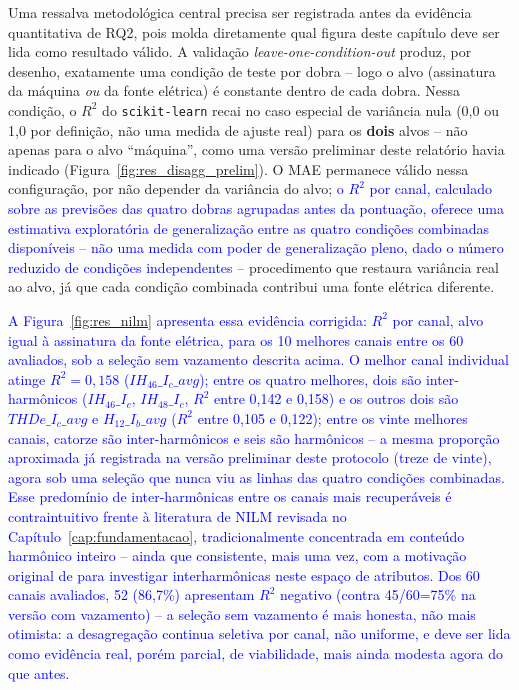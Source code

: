 \documentclass[times,final]{elsarticle}
\begin{document}
Uma ressalva metodológica central precisa ser registrada antes da evidência quantitativa de RQ2, pois molda diretamente qual figura deste capítulo deve ser lida como resultado válido. A validação \textit{leave-one-condition-out} produz, por desenho, exatamente uma condição de teste por dobra -- logo o alvo (assinatura da máquina \emph{ou} da fonte elétrica) é constante dentro de cada dobra. Nessa condição, o $R^2$ do \texttt{scikit-learn} recai no caso especial de variância nula (0,0 ou 1,0 por definição, não uma medida de ajuste real) para os \textbf{dois} alvos -- não apenas para o alvo ``máquina'', como uma versão preliminar deste relatório havia indicado (Figura~\ref{fig:res_disagg_prelim}). O MAE permanece válido nessa configuração, por não depender da variância do alvo; \textcolor{blue}{o $R^2$ por canal, calculado sobre as previsões das quatro dobras agrupadas antes da pontuação, oferece uma estimativa exploratória de generalização entre as quatro condições combinadas disponíveis -- não uma medida com poder de generalização pleno, dado o número reduzido de condições independentes} -- procedimento que restaura variância real ao alvo, já que cada condição combinada contribui uma fonte elétrica diferente.

\textcolor{blue}{A Figura~\ref{fig:res_nilm} apresenta essa evidência corrigida: $R^2$ por canal, alvo igual à assinatura da fonte elétrica, para os 10 melhores canais entre os 60 avaliados, sob a seleção sem vazamento descrita acima. O melhor canal individual atinge $R^2=0{,}158$ ($IH_{46}\_I_c\_avg$); entre os quatro melhores, dois são inter-harmônicos ($IH_{46}\_I_c$, $IH_{48}\_I_c$, $R^2$ entre 0,142 e 0,158) e os outros dois são $THDe\_I_c\_avg$ e $H_{12}\_I_b\_avg$ ($R^2$ entre 0,105 e 0,122); entre os vinte melhores canais, catorze são inter-harmônicos e seis são harmônicos -- a mesma proporção aproximada já registrada na versão preliminar deste protocolo (treze de vinte), agora sob uma seleção que nunca viu as linhas das quatro condições combinadas. Esse predomínio de inter-harmônicas entre os canais mais recuperáveis é contraintuitivo frente à literatura de NILM revisada no Capítulo~\ref{cap:fundamentacao}, tradicionalmente concentrada em conteúdo harmônico inteiro \citep{djordjevic2017,bouhouras2017,li2019moea} -- ainda que consistente, mais uma vez, com a motivação original de \citet{efe2016} para investigar interharmônicas neste espaço de atributos. Dos 60 canais avaliados, 52 (86,7\%) apresentam $R^2$ negativo (contra 45/60=75\% na versão com vazamento) -- a seleção sem vazamento é mais honesta, não mais otimista: a desagregação continua seletiva por canal, não uniforme, e deve ser lida como evidência real, porém parcial, de viabilidade, mais ainda modesta agora do que antes.}
\end{document}
